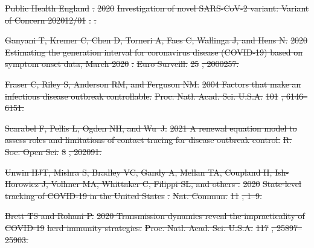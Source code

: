 \documentclass[12pt]{article}
\providecommand{\DIFdeltex}[1]{{\protect\color{red}\sout{#1}}}                      %
\providecommand{\DIFdel}[1]{\texorpdfstring{\DIFdeltex{#1}}{}} %
\begin{document}
\DIFdel{Public Health England}%
\DIFdel{.
}%
\DIFdel{2020 }%
\DIFdel{Investigation of novel SARS-CoV-2 variant: Variant of Concern
  202012/01}%
\DIFdel{.
}%
\DIFdel{.
}%

\DIFdel{Ganyani T, Kremer C, Chen D, Torneri A, Faes C, Wallinga J, and Hens N.
}%
\DIFdel{2020 }%
\DIFdel{Estimating the generation interval for coronavirus disease
  (COVID-19) based on symptom onset data, March 2020}%
\DIFdel{.
}%
\DIFdel{Euro Surveill.}%
\DIFdel{25}%
\DIFdel{, 2000257.
}%

\DIFdel{Fraser C, Riley S, Anderson RM, and Ferguson NM.
}%
\DIFdel{2004 Factors that make an infectious disease outbreak controllable.
}%
\DIFdel{Proc. Natl. Acad. Sci. U.S.A.}%
\DIFdel{101}%
\DIFdel{, 6146--6151.
}%

\DIFdel{Scarabel F, Pellis L, Ogden NH, and Wu~J.
}%
\DIFdel{2021 A renewal equation model to assess roles and limitations of
  contact tracing for disease outbreak control.
}%
\DIFdel{R. Soc. Open Sci.}%
\DIFdel{8}%
\DIFdel{, 202091.
}%

\DIFdel{Unwin HJT, Mishra S, Bradley VC, Gandy A, Mellan TA, Coupland H, Ish-Horowicz
  J, Vollmer MA, Whittaker C, Filippi SL, and others .
}%
\DIFdel{2020 }%
\DIFdel{State-level tracking of COVID-19 in the United States}%
\DIFdel{.
}%
\DIFdel{Nat. Commun.}%
\DIFdel{11}%
\DIFdel{, 1--9.
}%

\DIFdel{Brett TS and Rohani P.
}%
\DIFdel{2020 Transmission dynamics reveal the impracticality of }%
\DIFdel{COVID-19}%
\DIFdel{herd immunity strategies.
}%
\DIFdel{Proc. Natl. Acad. Sci. U.S.A.}%
\DIFdel{117}%
\DIFdel{, 25897--25903.
}%
\end{document}
